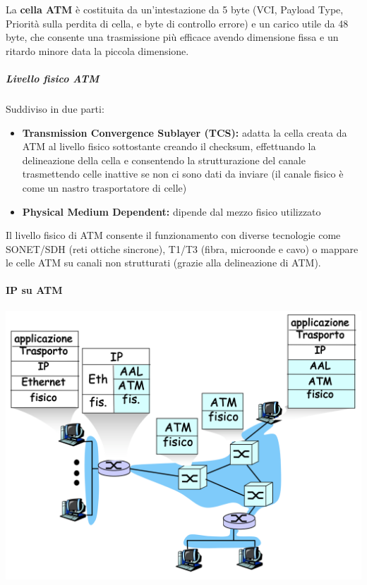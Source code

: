 \documentclass{report}
\begin{document}
La \textbf{cella ATM} è costituita da un'intestazione da 5 byte (VCI,
Payload Type, Priorità sulla perdita di cella, e byte di controllo
errore) e un carico utile da 48 byte, che consente una trasmissione più
efficace avendo dimensione fissa e un ritardo minore data la piccola
dimensione.

\hypertarget{header-n395}{%
\subparagraph{Livello fisico ATM}\label{header-n395}}

Suddiviso in due parti:

\begin{itemize}
\item
  \textbf{Transmission Convergence Sublayer (TCS):} adatta la cella
  creata da ATM al livello fisico sottostante creando il checksum,
  effettuando la delineazione della cella e consentendo la
  strutturazione del canale trasmettendo celle inattive se non ci sono
  dati da inviare (il canale fisico è come un nastro trasportatore di
  celle)
\item
  \textbf{Physical Medium Dependent:} dipende dal mezzo fisico
  utilizzato
\end{itemize}

Il livello fisico di ATM consente il funzionamento con diverse
tecnologie come SONET/SDH (reti ottiche sincrone), T1/T3 (fibra,
microonde e cavo) o mappare le celle ATM su canali non strutturati
(grazie alla delineazione di ATM).

\hypertarget{header-n403}{%
\paragraph{IP su ATM}\label{header-n403}}

\begin{center}
		\includegraphics[width=0.7\linewidth]{ip-su-atm}
	\end{center}
\end{document}
